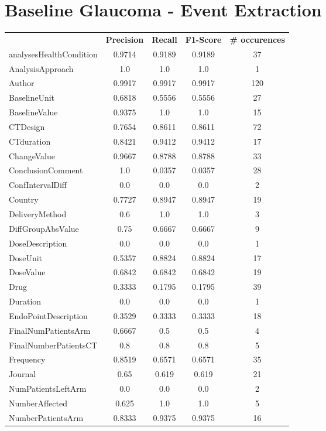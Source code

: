 \section{Baseline Glaucoma - Event Extraction}
\begin{longtable}{ l c c c c}
 & \textbf{Precision} & \textbf{Recall} & \textbf{F1-Score} & \textbf{\# occurences} \\ \cline{1-5}
analysesHealthCondition & 0.9714 & 0.9189 & 0.9189 & 37\\
AnalysisApproach & 1.0 & 1.0 & 1.0 & 1\\
Author & 0.9917 & 0.9917 & 0.9917 & 120\\
BaselineUnit & 0.6818 & 0.5556 & 0.5556 & 27\\
BaselineValue & 0.9375 & 1.0 & 1.0 & 15\\
CTDesign & 0.7654 & 0.8611 & 0.8611 & 72\\
CTduration & 0.8421 & 0.9412 & 0.9412 & 17\\
ChangeValue & 0.9667 & 0.8788 & 0.8788 & 33\\
ConclusionComment & 1.0 & 0.0357 & 0.0357 & 28\\
ConfIntervalDiff & 0.0 & 0.0 & 0.0 & 2\\
Country & 0.7727 & 0.8947 & 0.8947 & 19\\
DeliveryMethod & 0.6 & 1.0 & 1.0 & 3\\
DiffGroupAbsValue & 0.75 & 0.6667 & 0.6667 & 9\\
DoseDescription & 0.0 & 0.0 & 0.0 & 1\\
DoseUnit & 0.5357 & 0.8824 & 0.8824 & 17\\
DoseValue & 0.6842 & 0.6842 & 0.6842 & 19\\
Drug & 0.3333 & 0.1795 & 0.1795 & 39\\
Duration & 0.0 & 0.0 & 0.0 & 1\\
EndoPointDescription & 0.3529 & 0.3333 & 0.3333 & 18\\
FinalNumPatientsArm & 0.6667 & 0.5 & 0.5 & 4\\
FinalNumberPatientsCT & 0.8 & 0.8 & 0.8 & 5\\
Frequency & 0.8519 & 0.6571 & 0.6571 & 35\\
Journal & 0.65 & 0.619 & 0.619 & 21\\
NumPatientsLeftArm & 0.0 & 0.0 & 0.0 & 2\\
NumberAffected & 0.625 & 1.0 & 1.0 & 5\\
NumberPatientsArm & 0.8333 & 0.9375 & 0.9375 & 16\\

\end{longtable}

